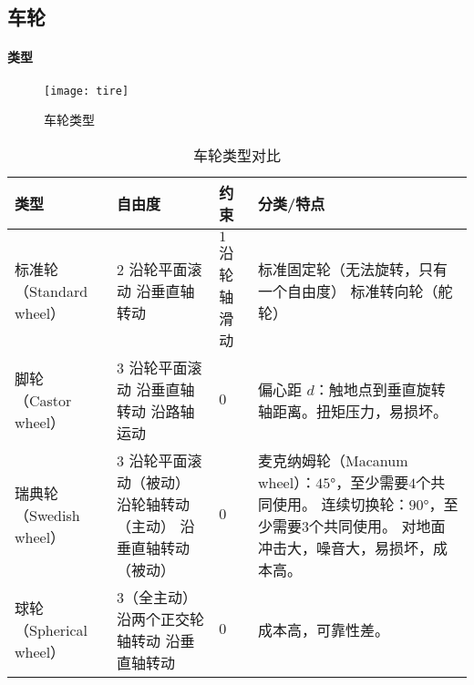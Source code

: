\documentclass[
12pt, %
a4paper, 
oneside, %
headinclude,footinclude, %
]{scrartcl}
\begin{document}
\subsection[车轮]{车轮}
\paragraph{类型}
\begin{figure}[H]
\centering 
\texttt{[image: tire]} 
\caption[车轮类型]{车轮类型}
\end{figure}

\begin{table}[H]
\centering
\caption{车轮类型对比}
\begin{tabular}{|p{2cm}|p{4.2cm}|p{2.2cm}|p{7cm}|}
\hline
类型 & 自由度 & 约束 & 分类/特点 \\
\hline
标准轮 \newline （Standard wheel） & $ 2 $ \newline 沿轮平面滚动 \newline 沿垂直轴转动 & $ 1 $ \newline 沿轮轴滑动 & 标准固定轮（无法旋转，只有一个自由度） \newline 标准转向轮（舵轮） \\
\hline
脚轮 \newline （Castor wheel） & $ 3 $ \newline 沿轮平面滚动 \newline 沿垂直轴转动 \newline 沿路轴运动 & $ 0 $ & 偏心距 $ d $：触地点到垂直旋转轴距离。扭矩压力，易损坏。 \\
\hline
瑞典轮 \newline （Swedish wheel） & $ 3 $ \newline 沿轮平面滚动（被动） \newline 沿轮轴转动（主动） \newline 沿垂直轴转动（被动） & $ 0 $ & 麦克纳姆轮（Macanum wheel）：$ 45° $，至少需要$ 4 $个共同使用。 \newline 连续切换轮：$ 90° $，至少需要$ 3 $个共同使用。 \newline 对地面冲击大，噪音大，易损坏，成本高。 \\
\hline
球轮 \newline （Spherical wheel） & $ 3 $（全主动） \newline 沿两个正交轮轴转动 \newline 沿垂直轴转动 & $ 0 $ & 成本高，可靠性差。 \\
\hline
\end{tabular}
\end{table}
\end{document}
